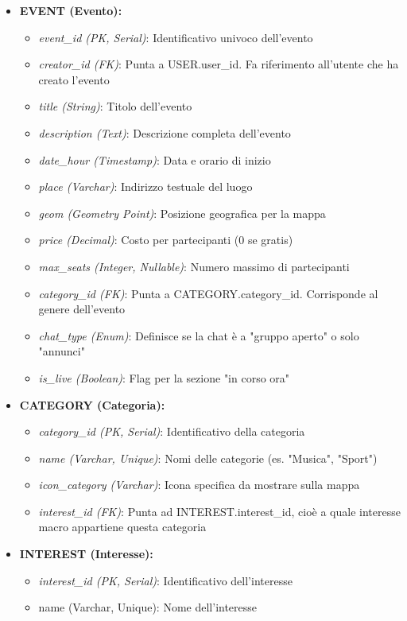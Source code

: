 \begin{itemize}[nosep, leftmargin=*]
        \item \textbf{EVENT (Evento):}
        \begin{itemize}
            \item \textit{event\_id (PK, Serial)}: Identificativo univoco dell'evento
            \item \textit{creator\_id (FK)}: Punta a USER.user\_id. Fa riferimento all'utente che ha creato l'evento
            \item \textit{title (String)}: Titolo dell'evento
            \item \textit{description (Text)}: Descrizione completa dell'evento
            \item \textit{date\_hour (Timestamp)}: Data e orario di inizio
            \item \textit{place (Varchar)}: Indirizzo testuale del luogo
            \item \textit{geom (Geometry Point)}: Posizione geografica per la mappa
            \item \textit{price (Decimal)}: Costo per partecipanti (0 se gratis)
            \item \textit{max\_seats (Integer, Nullable)}: Numero massimo di partecipanti
            \item \textit{category\_id (FK)}: Punta a CATEGORY.category\_id. Corrisponde al genere dell'evento
            \item \textit{chat\_type (Enum)}: Definisce se la chat è a "gruppo aperto" o solo "annunci"
            \item \textit{is\_live (Boolean)}: Flag per la sezione "in corso ora"
        \end{itemize}

        \item \textbf{CATEGORY (Categoria):}
        \begin{itemize}
            \item \textit{category\_id (PK, Serial)}: Identificativo della categoria
            \item \textit{name (Varchar, Unique)}: Nomi delle categorie (es. "Musica", "Sport")
            \item \textit{icon\_category (Varchar)}: Icona specifica da mostrare sulla mappa
            \item \textit{interest\_id (FK)}: Punta ad INTEREST.interest\_id, cioè a quale interesse macro appartiene questa categoria
        \end{itemize}

        \item \textbf{INTEREST (Interesse):}
        \begin{itemize}
            \item \textit{interest\_id (PK, Serial)}: Identificativo dell'interesse
            \item{name (Varchar, Unique)}: Nome dell'interesse
        \end{itemize}


\end{itemize}
